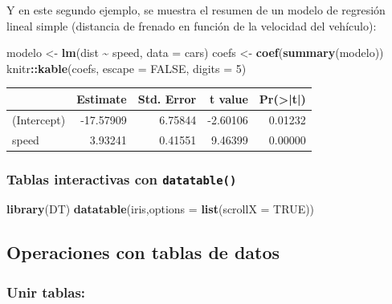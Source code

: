 \documentclass[
]{book}
\newenvironment{Shaded}{\begin{snugshade}}{\end{snugshade}}
\newcommand{\AttributeTok}[1]{\textcolor[rgb]{0.13,0.29,0.53}{#1}}
\newcommand{\ConstantTok}[1]{\textcolor[rgb]{0.56,0.35,0.01}{#1}}
\newcommand{\DecValTok}[1]{\textcolor[rgb]{0.00,0.00,0.81}{#1}}
\newcommand{\FunctionTok}[1]{\textcolor[rgb]{0.13,0.29,0.53}{\textbf{#1}}}
\newcommand{\NormalTok}[1]{#1}
\newcommand{\OtherTok}[1]{\textcolor[rgb]{0.56,0.35,0.01}{#1}}
\newcommand{\SpecialCharTok}[1]{\textcolor[rgb]{0.81,0.36,0.00}{\textbf{#1}}}
\theoremstyle{break}
\theoremstyle{nonumberplain}
\begin{document}
Y en este segundo ejemplo, se muestra el resumen de un modelo de regresión lineal simple (distancia de frenado en función de la velocidad del vehículo):

\begin{Shaded}
\begin{Highlighting}[]
\NormalTok{modelo }\OtherTok{\textless{}{-}} \FunctionTok{lm}\NormalTok{(dist }\SpecialCharTok{\textasciitilde{}}\NormalTok{ speed, }\AttributeTok{data =}\NormalTok{ cars)}
\NormalTok{coefs }\OtherTok{\textless{}{-}} \FunctionTok{coef}\NormalTok{(}\FunctionTok{summary}\NormalTok{(modelo))}
\NormalTok{knitr}\SpecialCharTok{::}\FunctionTok{kable}\NormalTok{(coefs, }\AttributeTok{escape =} \ConstantTok{FALSE}\NormalTok{, }\AttributeTok{digits =} \DecValTok{5}\NormalTok{)}
\end{Highlighting}
\end{Shaded}

\begin{tabular}{l|r|r|r|r}
\hline
  & Estimate & Std. Error & t value & Pr(>|t|)\\
\hline
(Intercept) & -17.57909 & 6.75844 & -2.60106 & 0.01232\\
\hline
speed & 3.93241 & 0.41551 & 9.46399 & 0.00000\\
\hline
\end{tabular}

\subsubsection{\texorpdfstring{Tablas interactivas con \texttt{datatable()}}{Tablas interactivas con datatable()}}\label{tablas-interactivas-con-datatable}

\begin{Shaded}
\begin{Highlighting}[]
\FunctionTok{library}\NormalTok{(DT)}
\FunctionTok{datatable}\NormalTok{(iris,}\AttributeTok{options =} \FunctionTok{list}\NormalTok{(}\AttributeTok{scrollX =} \ConstantTok{TRUE}\NormalTok{))}
\end{Highlighting}
\end{Shaded}

\subsection{Operaciones con tablas de datos}\label{operaciones-con-tablas-de-datos}

\subsubsection{Unir tablas:}\label{unir-tablas}
\end{document}
